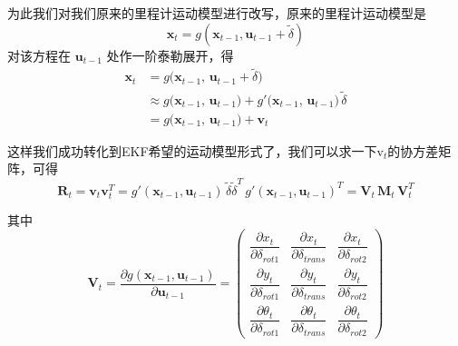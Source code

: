 \documentclass[../main.tex]{subfiles}
\begin{document}
\begin{enumerate}
{{\begin{enumerate}
    为此我们对我们原来的里程计运动模型进行改写，原来的里程计运动模型是
    $$
    \mathbf{x}_t = g(\mathbf{x}_{t-1},\mathbf{u}_{t-1} + \tilde{\delta})
    $$
    对该方程在 $\mathbf{u}_{t-1}$ 处作一阶泰勒展开，得
    \begin{align*}
    \mathbf{x}_t &= g\big(\mathbf{x}_{t-1},\,\mathbf{u}_{t-1} + \tilde{\delta}\big) \\
    &\approx g\big(\mathbf{x}_{t-1},\,\mathbf{u}_{t-1}\big)
           + g'\big(\mathbf{x}_{t-1},\,\mathbf{u}_{t-1}\big)\,\tilde{\delta} \\
    &= g\big(\mathbf{x}_{t-1},\,\mathbf{u}_{t-1}\big) + \mathbf{v}_t
    \end{align*}
    
    这样我们成功转化到EKF希望的运动模型形式了，我们可以求一下$\mathrm{v}_t$的协方差矩阵，可得
    $$
    \mathbf{R}_t = \mathbf{v}_t \mathbf{v}_t^T = g'(\mathbf{x}_{t-1},\mathbf{u}_{t-1})\,\tilde{\delta}\tilde{\delta}^T\, g'(\mathbf{x}_{t-1},\mathbf{u}_{t-1})^T
    = \mathbf{V}_t\,\mathbf{M}_t\,\mathbf{V}_t^T
    $$
    
    其中
    $$
    \mathbf{V}_t = \frac{\partial g(\mathbf{x}_{t-1},\mathbf{u}_{t-1})}{\partial \mathbf{u}_{t-1}}
    =
    \begin{pmatrix}
      \dfrac{\partial x_t}{\partial \delta_{rot1}} & \dfrac{\partial x_t}{\partial \delta_{trans}} & \dfrac{\partial x_t}{\partial \delta_{rot2}}\\[6pt]
      \dfrac{\partial y_t}{\partial \delta_{rot1}} & \dfrac{\partial y_t}{\partial \delta_{trans}} & \dfrac{\partial y_t}{\partial \delta_{rot2}}\\[6pt]
      \dfrac{\partial \theta_t}{\partial \delta_{rot1}} & \dfrac{\partial \theta_t}{\partial \delta_{trans}} & \dfrac{\partial \theta_t}{\partial \delta_{rot2}}
    \end{pmatrix}
    $$
    

\end{enumerate}}}
\end{enumerate}
\end{document}
